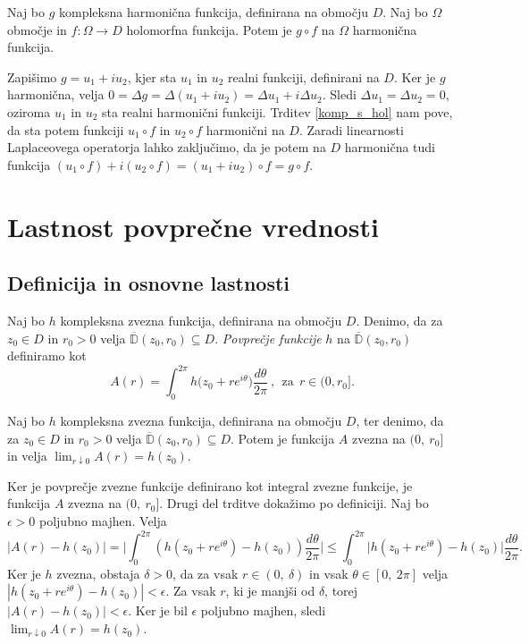 \documentclass[mat1, tisk]{fmfdelo}
\begin{document}
    \begin{posledica}
        \label{komp_s_hol_komp}
        Naj bo $g$ kompleksna harmonična funkcija, definirana na območju $D$. Naj bo $\Omega$ območje in $f : \Omega \to D$ holomorfna funkcija. Potem je $g \circ f$ na $\Omega$ harmonična funkcija.
    \end{posledica}
    \begin{dokaz}
        Zapišimo $g = u_1 + i u_2$, kjer sta $u_1$ in $u_2$ realni funkciji, definirani na $D$. 
        Ker je $g$ harmonična, velja $ 0 = \Delta g = \Delta(u_1 + i u_2) = \Delta u_1 + i \Delta u_2$. Sledi $\Delta u_1 = \Delta u_2 = 0$, oziroma $u_1$ in $u_2$ sta realni harmonični funkciji.
        Trditev \ref{komp_s_hol} nam pove, da sta potem funkciji $u_1 \circ f$ in $u_2 \circ f$ harmonični na $D$. Zaradi linearnosti Laplaceovega operatorja lahko zaključimo, da je potem na $D$ harmonična tudi funkcija $(u_1 \circ f) + i (u_2 \circ f) = (u_1 + i u_2) \circ f = g \circ f$.
    \end{dokaz}

\section{Lastnost povprečne vrednosti}
\subsection{Definicija in osnovne lastnosti}
    \begin{definicija}  
        Naj bo $h$ kompleksna zvezna funkcija, definirana na območju $D$. Denimo, da za $z_0 \in D$ in $r_0 > 0$ velja $\overline{\mathbb{D}}(z_0, r_0) \subseteq D$. \emph{Povprečje funkcije} $h$ na $\overline{\mathbb{D}}(z_0, r_0)$ definiramo kot
        $$
            A(r) = \int_{0}^{2 \pi}{h \big(z_0 + r e^{i\theta}\big)\frac{d\theta}{2 \pi}}~,~~\text{za}~~r \in (0,r_0].
        $$
    \end{definicija}
    \begin{trditev}
        \label{zvpov}
        Naj bo $h$ kompleksna zvezna funkcija, definirana na območju $D$, ter denimo, da za $z_0 \in D$ in $r_0 > 0$ velja $\overline{\mathbb{D}}(z_0, r_0) \subseteq D$. 
        Potem je funkcija $A$ zvezna na $(0,~r_0]$ in velja $\lim_{r \downarrow 0}{A(r)} = h(z_0)$.
    \end{trditev}
    \begin{dokaz}
        Ker je povprečje zvezne funkcije definirano kot integral zvezne funkcije, je funkcija $A$ zvezna na $(0,~r_0]$. Drugi del trditve dokažimo po definiciji.
        Naj bo $\epsilon > 0$ poljubno majhen. Velja
        $$
            |A(r) - h(z_0)| = \bigg|\int_{0}^{2\pi} \left(h(z_0 + r e^{i\theta})  - h(z_0)\right) \frac{d\theta}{2\pi} \bigg| \leq \int_{0}^{2 \pi} \big| h(z_0 + r e^{i\theta}) - h(z_0) \big| \frac{d\theta}{2 \pi}.
        $$
        Ker je $h$ zvezna, obstaja $\delta > 0$, da za vsak $r \in  (0,~\delta)$ in vsak $\theta \in [0,~2\pi]$ velja \mbox{$|h(z_0 + r e^{i\theta}) - h(z_0)| < \epsilon$}.
        Za vsak $r$, ki je manjši od $\delta$, torej $|A(r) - h(z_0)| < \epsilon$. Ker je bil $\epsilon$ poljubno majhen, sledi $\lim_{r \downarrow 0}{A(r)} = h(z_0)$.
    \end{dokaz}
\end{document}
